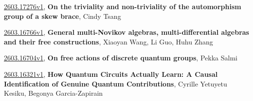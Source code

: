 \documentclass[9pt, a4paper]{article}
\theoremstyle{plain}
\theoremstyle{definition}
\theoremstyle{remark}
\newcommand{\arxiv}[3]{\href{https://arxiv.org/abs/#1}{#1}, \textbf{\textcolor{arxivblue}{#2}}, #3}
\begin{document}
\arxiv{2603.17276v1}{On the triviality and non-triviality of the automorphism group of a skew brace}{Cindy Tsang}

\arxiv{2603.16766v1}{General multi-Novikov algebras, multi-differential algebras and their free constructions}{Xiaoyan Wang, Li Guo, Huhu Zhang}

\arxiv{2603.16704v1}{On free actions of discrete quantum groups}{Pekka Salmi}

\arxiv{2603.16321v1}{How Quantum Circuits Actually Learn: A Causal Identification of Genuine Quantum Contributions}{Cyrille Yetuyetu Kesiku, Begonya Garcia-Zapirain}

\end{document}
